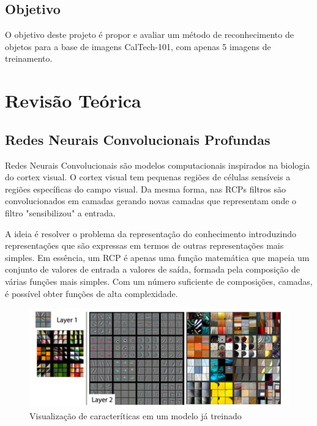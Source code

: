 \documentclass[conference]{IEEEtran}
\begin{document}
\subsection{Objetivo}
O objetivo deste projeto é propor e avaliar um método de reconhecimento de objetos para a base de imagens CalTech-101\cite{caltech101}, com apenas 5 imagens de treinamento. 

\section{Revisão Teórica}

\subsection{Redes Neurais Convolucionais Profundas}
Redes Neurais Convolucionais são modelos computacionais inspirados na biologia do cortex visual. O cortex visual tem pequenas regiões de células sensíveis a regiões específicas do campo visual\cite{hinton}.  Da mesma forma, nas RCPs filtros são convolucionados em camadas gerando novas camadas que representam onde o filtro "sensibilizou" a entrada. 

A ideia é resolver o problema da representação do conhecimento introduzindo representações que são expressas em termos de outras representações mais simples\cite{goodfellow}. Em essência, um RCP é apenas uma função matemática que mapeia um conjunto de valores de entrada a valores de saída, formada pela composição de várias funções mais simples.  Com um número suficiente de composições, camadas, é possível obter funções de alta complexidade\cite{hinton, goodfellow}. 


\begin{figure}[ht!]
\begin{center}
\includegraphics[width=\columnwidth]{layers.png}
\caption{Visualização de caracteríticas em um modelo já treinado\cite{zeiler}}
\label{layers}
\end{center}
\end{figure}
\end{document}
